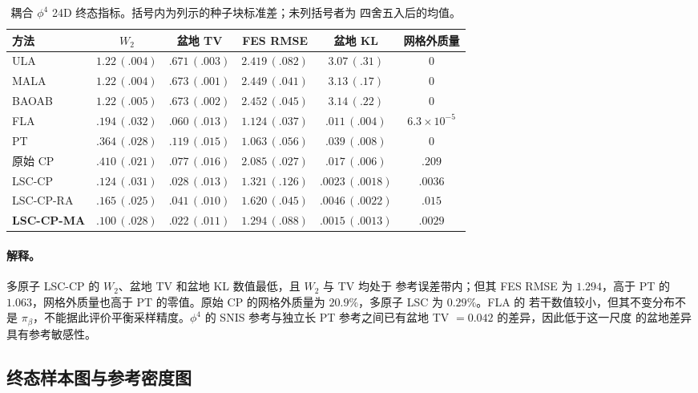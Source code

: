 \documentclass[11pt,a4paper]{article}
\renewcommand{\textsc}[1]{\textsf{\MakeUppercase{#1}}}
\begin{document}
\begin{table}[H]
\centering
\footnotesize
\setlength{\tabcolsep}{4.2pt}
\begin{tabular}{lccccc}
\toprule
方法 & $W_2$ & 盆地 TV & FES RMSE & 盆地 KL & 网格外质量 \\
\midrule
\textsc{ula} & $1.22\,(.004)$ & $.671\,(.003)$ & $2.419\,(.082)$ & $3.07\,(.31)$ & $0$ \\
\textsc{mala} & $1.22\,(.004)$ & $.673\,(.001)$ & $2.449\,(.041)$ & $3.13\,(.17)$ & $0$ \\
\textsc{baoab} & $1.22\,(.005)$ & $.673\,(.002)$ & $2.452\,(.045)$ & $3.14\,(.22)$ & $0$ \\
\textsc{fla} & $.194\,(.032)$ & $.060\,(.013)$ & $1.124\,(.037)$ & $.011\,(.004)$ & $6.3{\times}10^{-5}$ \\
\textsc{pt} & $.364\,(.028)$ & $.119\,(.015)$ & $1.063\,(.056)$ & $.039\,(.008)$ & $0$ \\
原始 \textsc{cp} & $.410\,(.021)$ & $.077\,(.016)$ & $2.085\,(.027)$ & $.017\,(.006)$ & $.209$ \\
\textsc{lsc-cp} & $.124\,(.031)$ & $.028\,(.013)$ & $1.321\,(.126)$ & $.0023\,(.0018)$ & $.0036$ \\
\textsc{lsc-cp-ra} & $.165\,(.025)$ & $.041\,(.010)$ & $1.620\,(.045)$ & $.0046\,(.0022)$ & $.015$ \\
\textbf{\textsc{lsc-cp-ma}} & $.100\,(.028)$ & $.022\,(.011)$ & $1.294\,(.088)$ & $.0015\,(.0013)$ & $.0029$ \\
\bottomrule
\end{tabular}
\caption{耦合 $\phi^4$ 24D 终态指标。括号内为列示的种子块标准差；未列括号者为
四舍五入后的均值。}
\end{table}

\paragraph{解释。}
多原子 LSC-CP 的 $W_2$、盆地 TV 和盆地 KL 数值最低，且 $W_2$ 与 TV 均处于
参考误差带内；但其 FES RMSE 为 $1.294$，高于 PT 的 $1.063$，网格外质量也高于
PT 的零值。原始 CP 的网格外质量为 $20.9\%$，多原子 LSC 为 $0.29\%$。FLA 的
若干数值较小，但其不变分布不是 $\pi_\beta$，不能据此评价平衡采样精度。$\phi^4$
的 SNIS 参考与独立长 PT 参考之间已有盆地 TV $=0.042$ 的差异，因此低于这一尺度
的盆地差异具有参考敏感性。

\subsection{终态样本图与参考密度图}
\end{document}
